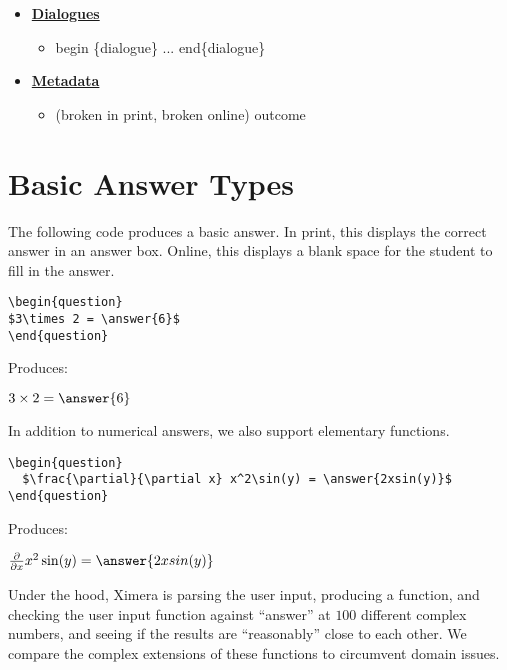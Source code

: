 \documentclass{ximera}
\begin{document}
\begin{remark}
\begin{itemize}
\begin{itemize}
    \item begin\{prompt\} ... end \{prompt\}
  \end{itemize}
\item \hyperref[Dialogue]{\textbf{Dialogues}}
  \begin{itemize}
    \item begin \{dialogue\} ... end\{dialogue\}
  \end{itemize}
\item \hyperref[Metadata]{\textbf{Metadata}}
  \begin{itemize}
    \item (broken in print, broken online) outcome
  \end{itemize}

\end{itemize}

\end{remark}


\section{Basic Answer Types}  
\label{BasicAnswerType}

\begin{example}
The following code produces a basic answer. In print, this displays the correct answer in an answer box. Online, this displays a blank space for the student to fill in the answer. 

\begin{verbatim}
\begin{question}
$3\times 2 = \answer{6}$
\end{question}
\end{verbatim}

Produces:

\begin{question}
$3\times 2 = \answer{6}$
\end{question}
\end{example}

\begin{example}
In addition to numerical answers, we also support elementary functions.

\begin{verbatim}
\begin{question}
  $\frac{\partial}{\partial x} x^2\sin(y) = \answer{2xsin(y)}$
\end{question}
\end{verbatim}

Produces:

\begin{question}
  $\frac{\partial}{\partial x} x^2\sin(y) = \answer{2xsin(y)}$
\end{question}


\begin{remark}
Under the hood, Ximera is parsing the user input, producing a
function, and checking the user input function against ``answer'' at
$100$ different complex numbers, and seeing if the results are
``reasonably'' close to each other.  We compare the complex extensions
of these functions to circumvent domain issues.
\end{remark}
\end{example}
\end{document}
